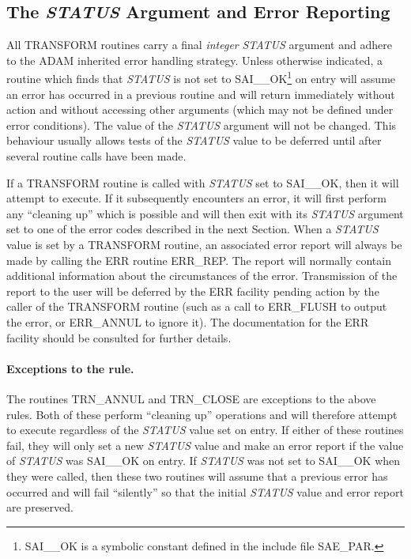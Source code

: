 \documentclass[twoside,nolof,11pt]{starlink}
\providecommand{\name}[1]{\small{#1}}
\providecommand{\fortvar}[1]{\emph{#1}}
\begin{document}
\label{appendix:error}


\subsection{%
The \fortvar{STATUS} Argument and Error Reporting}

All \name{TRANSFORM} routines carry a final \emph{integer} \fortvar{STATUS}
argument and adhere to the \name{ADAM} inherited error handling strategy.
Unless otherwise indicated, a routine which finds that \fortvar{STATUS} is
not set to \name{SAI\_\_OK}\footnote{
\name{SAI\_\_OK} is a symbolic constant defined in the include file
\name{SAE\_PAR}.
}
on entry will assume an error has occurred in a previous routine and will
return immediately without action and without accessing other arguments
(which may not be defined under error conditions).
The value of the \fortvar{STATUS} argument will not be changed.
This behaviour usually allows tests of the \fortvar{STATUS} value to be
deferred until after several routine calls have been made.

If a \name{TRANSFORM} routine is called with \fortvar{STATUS} set to
\name{SAI\_\_OK}, then it will attempt to execute.
If it subsequently encounters an error, it will first perform any ``cleaning
up'' which is possible and will then exit with its \fortvar{STATUS} argument
set to one of the error codes described in the next Section.
When a \fortvar{STATUS} value is set by a \name{TRANSFORM} routine, an
associated error report will always be made by calling the \name{ERR}
routine \name{ERR\_REP}.
The report will normally contain additional information about the
circumstances of the error.
Transmission of the report to the user will be deferred by the \name{ERR}
facility pending action by the caller of the \name{TRANSFORM} routine
(such as a call to \name{ERR\_FLUSH} to output the error, or
\name{ERR\_ANNUL} to ignore it).
The documentation for the \name{ERR} facility should be consulted for
further details.

\paragraph{Exceptions to the rule.}
The routines \name{TRN\_ANNUL} and \name{TRN\_CLOSE} are exceptions to the
above rules.
Both of these perform ``cleaning up'' operations and will therefore attempt
to execute regardless of the \fortvar{STATUS} value set on entry.
If either of these routines fail, they will only set a new \fortvar{STATUS}
value and make an error report if the value of \fortvar{STATUS} was
\name{SAI\_\_OK} on entry.
If \fortvar{STATUS} was not set to \name{SAI\_\_OK} when they were called,
then these two routines will assume that a previous error has occurred and
will fail ``silently'' so that the initial \fortvar{STATUS} value and error
report are preserved.
\end{document}
